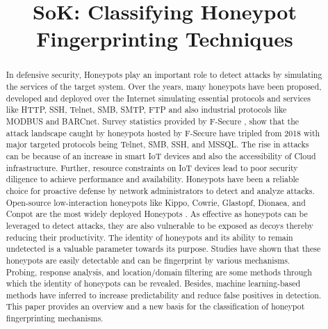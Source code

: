 \documentclass[letterpaper, 10 pt, conference]{ieeeconf}  %
\title{\LARGE \bf
SoK: Classifying Honeypot Fingerprinting Techniques
}
\begin{document}
\maketitle
\thispagestyle{empty}
\pagestyle{empty}
\begin{abstract}
In defensive security, Honeypots play an important role to detect attacks by simulating the services of the target system. Over the years, many honeypots have been proposed, developed and deployed over the Internet simulating essential protocols and services like HTTP, SSH, Telnet, SMB, SMTP, FTP and also industrial protocols like MODBUS and BARCnet. Survey statistics provided by F-Secure \cite{F-Secure}, show that the attack landscape caught by honeypots hosted by F-Secure have tripled from 2018 with major targeted protocols being Telnet, SMB, SSH, and  MSSQL. The rise in attacks can be because of an increase in smart IoT devices and also the accessibility of Cloud infrastructure. Further, resource constraints on IoT devices lead to poor security diligence to achieve performance and availability. Honeypots have been a reliable choice for proactive defense by network administrators to detect and analyze attacks. Open-source low-interaction honeypots like Kippo, Cowrie, Glastopf, Dionaea, and Conpot are the most widely deployed Honeypots \cite{Vetterl2018}. As effective as honeypots can be leveraged to detect attacks, they are also vulnerable to be exposed as decoys thereby reducing their productivity. The identity of honeypots and its ability to remain undetected is a valuable parameter towards its purpose. Studies have shown that these honeypots are easily detectable and can be fingerprint by various mechanisms. Probing, response analysis, and location/domain filtering are some methods through which the identity of honeypots can be revealed. Besides, machine learning-based methods have inferred to increase predictability and reduce false positives in detection. This paper provides an overview and a new basis for the classification of honeypot fingerprinting mechanisms. 
\end{abstract}




\end{document}
